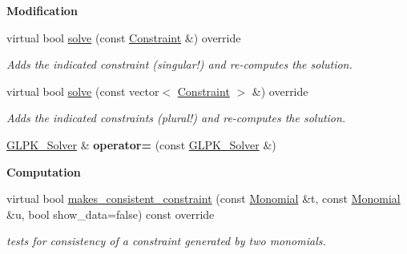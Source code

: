 \begin{Indent}\textbf{ Modification}\par
\begin{DoxyCompactItemize}
\item 
virtual bool \hyperlink{group___c_l_s_solvers_aadfa4655b194b3b095db962c5900fee6}{solve} (const \hyperlink{group___c_l_s_solvers_class_l_p___solvers_1_1_constraint}{Constraint} \&) override
\begin{DoxyCompactList}\small\item\em Adds the indicated constraint (singular!) and re-\/computes the solution. \end{DoxyCompactList}\item 
virtual bool \hyperlink{group___c_l_s_solvers_a08fcdf86d0fcd8ac3e5da077b627e477}{solve} (const vector$<$ \hyperlink{group___c_l_s_solvers_class_l_p___solvers_1_1_constraint}{Constraint} $>$ \&) override
\begin{DoxyCompactList}\small\item\em Adds the indicated constraints (plural!) and re-\/computes the solution. \end{DoxyCompactList}\item 
\mbox{\label{group___c_l_s_solvers_a3e13ece396c9c302c185167d9364e701}} 
\hyperlink{group___c_l_s_solvers_class_l_p___solvers_1_1_g_l_p_k___solver}{G\+L\+P\+K\+\_\+\+Solver} \& {\bfseries operator=} (const \hyperlink{group___c_l_s_solvers_class_l_p___solvers_1_1_g_l_p_k___solver}{G\+L\+P\+K\+\_\+\+Solver} \&)
\end{DoxyCompactItemize}
\end{Indent}
\begin{Indent}\textbf{ Computation}\par
\begin{DoxyCompactItemize}
\item 
\mbox{\label{group___c_l_s_solvers_a23e950a4911f140ddffdcaeb062f7b80}} 
virtual bool \hyperlink{group___c_l_s_solvers_a23e950a4911f140ddffdcaeb062f7b80}{makes\+\_\+consistent\+\_\+constraint} (const \hyperlink{group__polygroup_class_monomial}{Monomial} \&t, const \hyperlink{group__polygroup_class_monomial}{Monomial} \&u, bool show\+\_\+data=false) const override
\begin{DoxyCompactList}\small\item\em tests for consistency of a constraint generated by two monomials. \end{DoxyCompactList}\end{DoxyCompactItemize}
\end{Indent}
